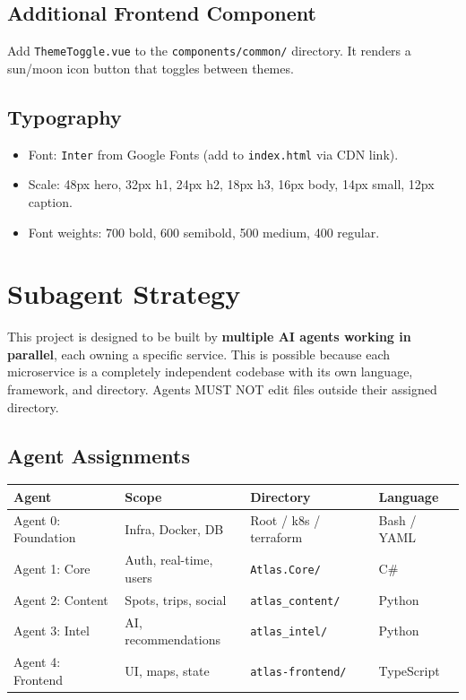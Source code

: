\documentclass[12pt,letterpaper]{article}
\begin{document}
\subsection{Additional Frontend Component}
Add \texttt{ThemeToggle.vue} to the \texttt{components/common/} directory. It renders a sun/moon icon button that toggles between themes.

\subsection{Typography}
\begin{itemize}
  \item Font: \texttt{Inter} from Google Fonts (add to \texttt{index.html} via CDN link).
  \item Scale: 48px hero, 32px h1, 24px h2, 18px h3, 16px body, 14px small, 12px caption.
  \item Font weights: 700 bold, 600 semibold, 500 medium, 400 regular.
\end{itemize}

\newpage

\section{Subagent Strategy}

This project is designed to be built by \textbf{multiple AI agents working in parallel}, each owning a specific service. This is possible because each microservice is a completely independent codebase with its own language, framework, and directory. Agents MUST NOT edit files outside their assigned directory.

\subsection{Agent Assignments}

\begin{tabular}{|l|l|l|l|}
\hline
\textbf{Agent} & \textbf{Scope} & \textbf{Directory} & \textbf{Language} \\
\hline
Agent 0: Foundation & Infra, Docker, DB & Root / k8s / terraform & Bash / YAML \\
Agent 1: Core & Auth, real-time, users & \texttt{Atlas.Core/} & C\# \\
Agent 2: Content & Spots, trips, social & \texttt{atlas\_content/} & Python \\
Agent 3: Intel & AI, recommendations & \texttt{atlas\_intel/} & Python \\
Agent 4: Frontend & UI, maps, state & \texttt{atlas-frontend/} & TypeScript \\
\hline
\end{tabular}
\end{document}
